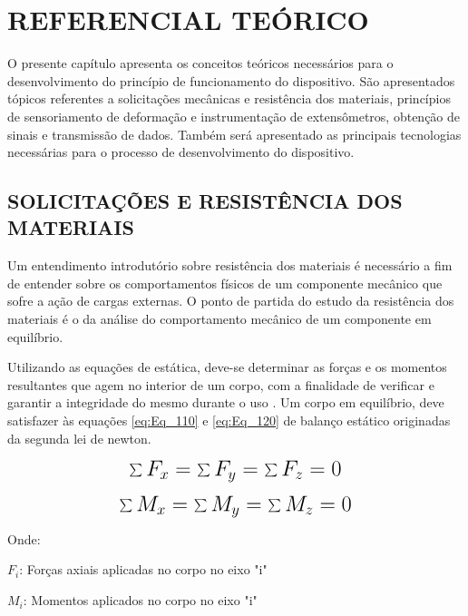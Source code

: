
\chapter{REFERENCIAL TEÓRICO}\label{cap:REFERENCIAL TEÓRICO}

O presente capítulo apresenta os conceitos teóricos necessários para o desenvolvimento do princípio de funcionamento do dispositivo. São apresentados tópicos referentes a solicitações mecânicas e resistência dos materiais, princípios de sensoriamento de deformação e instrumentação de extensômetros, obtenção de sinais e transmissão de dados. Também será apresentado as principais tecnologias necessárias para o processo de desenvolvimento do dispositivo.

\section{SOLICITAÇÕES E RESISTÊNCIA DOS MATERIAIS}

Um entendimento introdutório sobre resistência dos materiais é necessário a fim de entender sobre os comportamentos físicos de um componente mecânico que sofre a ação de cargas externas. O ponto de partida do estudo da resistência dos materiais é o da análise do comportamento mecânico de um componente em equilíbrio.

Utilizando as equações de estática, deve-se determinar as forças e os momentos resultantes que agem no interior de um corpo, com a finalidade de verificar e garantir a integridade do mesmo durante o uso \autocite{Hibbeler2010}. Um corpo em equilíbrio, deve satisfazer às equações \eqref{eq:Eq_110} e \eqref{eq:Eq_120} de balanço estático originadas da segunda lei de newton.

\begin{equation}\label{eq:Eq_110}%
\mbox{\fontsize{17.28}{21.6}\selectfont\( %
\sum F_{x} = \sum F_{y} = \sum F_{z} = 0
\)} %
\end{equation}

\begin{equation}\label{eq:Eq_120}%
\mbox{\fontsize{17.28}{21.6}\selectfont\( %
\sum M_{x} = \sum M_{y} = \sum M_{z} = 0
\)} %
\end{equation}

Onde:

$F_{i}$: Forças axiais aplicadas no corpo no eixo "i"

$M_{i}$: Momentos aplicados no corpo no eixo "i"

\hfill

